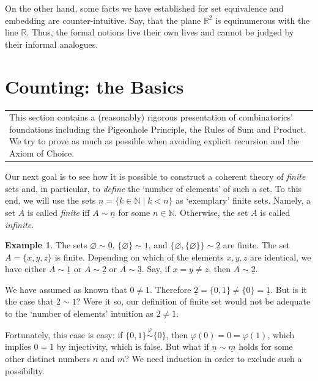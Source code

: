 \documentclass[12pt,notitlepage]{article}
\theoremstyle{plain}
\theoremstyle{definition}
\newtheorem{exm}[thm]{Example}
\theoremstyle{plain}
\newcommand{\N}{\mathbb{N}}
\newcommand{\R}{\mathbb{R}}
\newcommand{\void}{\varnothing}
\renewcommand{\phi}{\varphi}
\newcommand{\ul}[1]{\underline{#1}}
\newcommand{\1}{\mathbf{1}}
\newcommand{\0}{\mathbf{0}}
\newcommand{\mcomm}[1]{
\medskip\noindent\begin{tabular}{| l}
\parbox{0.99\textwidth}{{\small
#1 }}\end{tabular}
\smallskip}
\begin{document}
On the other hand, some facts we have established for set equivalence and embedding are counter-intuitive. Say, that the plane $\R^2$ is equinumerous with the line $\R$. Thus, the formal notions live their own lives and cannot be judged by their informal analogues.

\section{Counting: the Basics}\label{sect:comb1}
\mcomm{This section contains a (reasonably) rigorous presentation of combinatorics' foundations including the Pigeonhole Principle, the Rules of Sum and Product. We try to prove as much as possible when avoiding explicit recursion and the Axiom of Choice.}

Our next goal is to see how it is possible to construct a coherent theory of \emph{finite} sets and, in particular, to \emph{define} the `number of elements' of such a set. To this end, we will use the sets $\ul{n} = \{k \in \N \mid k < n \}$ as `exemplary' finite sets. Namely, a set $A$ is called \emph{finite} iff $A \sim \ul{n}$ for some $n \in \N$. Otherwise, the set $A$ is called \emph{infinite}.

\begin{exm}
The sets $\void \sim \ul{0}$, $\{\void\} \sim \ul{1}$, and $\{\void, \{\void\}\} \sim \ul{2}$ are finite. The set $A = \{x,y,z\}$ is finite. Depending on which of the elements $x,y,z$ are identical, we have either $A \sim \ul{1}$ or $A \sim \ul{2}$ or $A \sim \ul{3}$. Say, if $x = y \neq z$, then $A \sim \ul{2}$.
\end{exm}

We have assumed as known that $0 \neq 1$. Therefore $\ul{2} = \{0,1\} \neq \{0\} = \ul{1}$. But is it the case that $\ul{2} \sim \ul{1}$? Were it so, our definition of finite set would not be adequate to the `number of elements' intuition as $2 \neq 1$.

Fortunately, this case is easy: if $\{0,1\} \stackrel{\phi}{\sim} \{0\}$, then $\phi(0) = 0 = \phi(1)$, which implies $0 = 1$ by injectivity, which is false. But what if $\ul{n} \sim \ul{m}$ holds for some other distinct numbers $n$ and $m$? We need induction in order to exclude such a possibility.
\end{document}
